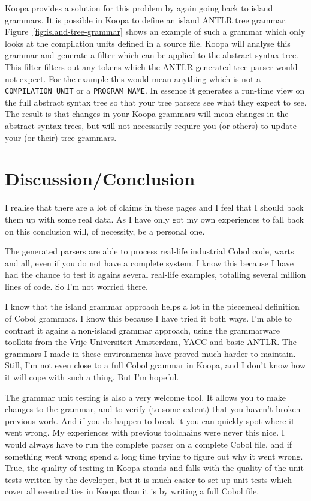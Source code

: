 \documentclass[a4paper]{article}
\begin{document}
Koopa provides a solution for this problem by again going back to island grammars. It is possible in Koopa to define an island ANTLR tree grammar. Figure~\ref{fig:island-tree-grammar} shows an example of such a grammar which only looks at the compilation units defined in a source file. Koopa will analyse this grammar and generate a filter which can be applied to the abstract syntax tree. This filter filters out any tokens which the ANTLR generated tree parser would not expect. For the example this would mean anything which is not a \lstinline|COMPILATION_UNIT| or a \lstinline|PROGRAM_NAME|. In essence it generates a run-time view on the full abstract syntax tree so that your tree parsers see what they expect to see. The result is that changes in your Koopa grammars will mean changes in the abstract syntax trees, but will not necessarily require you (or others) to update your (or their) tree grammars.


\section{Discussion/Conclusion}
\label{conclusion}

I realise that there are a lot of claims in these pages and I feel that I should back them up with some real data. As I have only got my own experiences to fall back on this conclusion will, of necessity, be a personal one.

The generated parsers are able to process real-life industrial Cobol code, warts and all, even if you do not have a complete system. I know this because I have had the chance to test it agains several real-life examples, totalling several million lines of code. So I'm not worried there.

I know that the island grammar approach helps a lot in the piecemeal definition of Cobol grammars. I know this because I have tried it both ways. I'm able to contrast it agains a non-island grammar approach, using the grammarware toolkits from the Vrije Universiteit Amsterdam, YACC and basic ANTLR. The grammars I made in these environments have proved much harder to maintain. Still, I'm not even close to a full Cobol grammar in Koopa, and I don't know how it will cope with such a thing. But I'm hopeful.

The grammar unit testing is also a very welcome tool. It allows you to make changes to the grammar, and to verify (to some extent) that you haven't broken previous work. And if you do happen to break it you can quickly spot where it went wrong. My experiences with previous toolchains were never this nice. I would always have to run the complete parser on a complete Cobol file, and if something went wrong spend a long time trying to figure out why it went wrong. True, the quality of testing in Koopa stands and falls with the quality of the unit tests written by the developer, but it is much easier to set up unit tests which cover all eventualities in Koopa than it is by writing a full Cobol file.
\end{document}
